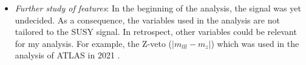 \begin{itemize}
          given the goal of extending the limits, it would most likely be beneficial to prioritize the regions closest to the existing limits, in hopes of achieving a higher sensitivity in these 
          regions\footnote{See the final paragraph in section \ref{sec:PCA}}.  
    \item \emph{Further study of features}: In the beginning of the analysis, the signal was yet undecided. As a consequence, the variables used in the analysis are not tailored to the \ac{SUSY} 
          signal. In retrospect, other variables could be relevant for my analysis. For example, the Z-veto ($|m_{lll}-m_z|$) which was used in the analysis of \ac{ATLAS} in 2021 \cite{atlas_search_2021}. 
\end{itemize}


